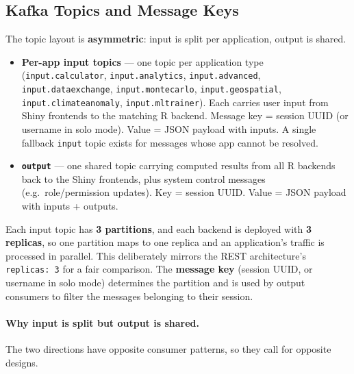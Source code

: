 \documentclass[12pt,a4paper]{article}
\begin{document}
\subsection{Kafka Topics and Message Keys}

The topic layout is \textbf{asymmetric}: input is split per application, output is shared.

\begin{itemize}[nosep]
  \item \textbf{Per-app input topics} --- one topic per application type (\texttt{input.calculator}, \texttt{input.analytics}, \texttt{input.advanced}, \texttt{input.dataexchange}, \texttt{input.montecarlo}, \texttt{input.geospatial}, \texttt{input.climateanomaly}, \texttt{input.mltrainer}). Each carries user input from Shiny frontends to the matching R backend. Message key = session UUID (or username in solo mode). Value = JSON payload with inputs. A single fallback \texttt{input} topic exists for messages whose app cannot be resolved.
  \item \textbf{\texttt{output}} --- one shared topic carrying computed results from all R backends back to the Shiny frontends, plus system control messages (e.g.\ role/permission updates). Key = session UUID. Value = JSON payload with inputs + outputs.
\end{itemize}

Each input topic has \textbf{3 partitions}, and each backend is deployed with \textbf{3 replicas}, so one partition maps to one replica and an application's traffic is processed in parallel. This deliberately mirrors the REST architecture's \texttt{replicas: 3} for a fair comparison. The \textbf{message key} (session UUID, or username in solo mode) determines the partition and is used by output consumers to filter the messages belonging to their session.

\paragraph{Why input is split but output is shared.} The two directions have opposite consumer patterns, so they call for opposite designs.
\end{document}

